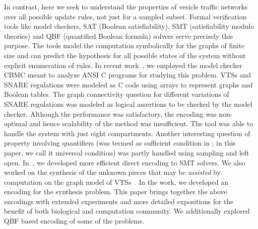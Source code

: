 %
%
%
%
%
%
%
%

In contrast, here we seek to understand the properties of vesicle traffic networks
over all possible update rules, not just for a sampled subset.
%
Formal verification tools like model checkers, SAT (Boolean satisfiability), SMT (satisfiability modulo theories) and QBF (quantified Boolean formula) solvers serve precisely this purpose. 
%
The tools model the computation symbolically for the graphs of finite size and can predict the hypothesis for all possible states of the system without explicit enumeration of rules. 
%
In recent work~\cite{shukla2017discovering}, we employed the model checker CBMC \cite{ckl2004} meant to analyze ANSI C programs for studying this problem. 
%
VTSs and SNARE regulations were modeled as C code using arrays to represent graphs and Boolean tables. 
%
The graph connectivity question for different variations of SNARE regulations was modeled as logical assertions to be checked by the model checker. 
%
Although the performance was satisfactory, the encoding was non-optimal and hence scalability of the method was insufficient. The tool was able to handle the system with just eight compartments.
%
Another interesting question of property involving quantifiers (was termed as sufficient condition in \cite{shukla2017discovering}; in this paper, we call it universal condition) was partly handled
using sampling and left open.
%
In~\cite{smtVTS}, we developed more efficient direct encoding to SMT solvers. 
%
We also worked on the synthesis of the unknown pieces that may
be {\em assisted} by computation on the graph model of VTSs~\cite{synthesisGupta}.
%
In the work, we developed an encoding for the synthesis problem.
%
This paper brings together the above encodings with extended experiments and more detailed
expositions for the benefit of both biological and computation community.
We additionally explored QBF based encoding of some of the problems.


